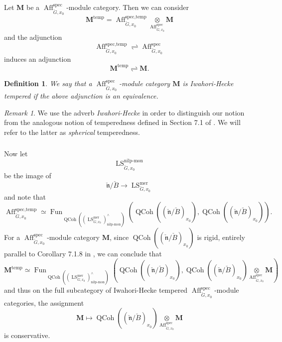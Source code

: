 \documentclass[10pt]{amsart}
\newtheorem{defn}[subsubsection]{Definition}
\theoremstyle{remark}
\newtheorem{rem}[subsubsection]{Remark}
\newcommand{\on}[1]{\operatorname{#1}}
\newcommand{\QCoh}{\on{QCoh}}
\newcommand{\Gcheck}{\check{G}}
\newcommand{\ncheck}{\check{\mathfrak{n}}}
\newcommand{\Bcheck}{\check{B}}
\newcommand{\sssec}[1]{\subsubsection{}}
\begin{document}
\sssec{}
Let $\boldsymbol{M}$ be a $\on{Aff}_{\Gcheck, x_0}^{\on{spec}}$-module category. Then we can consider
$$
\boldsymbol{M}^{\on{temp}} = \on{Aff}_{\Gcheck, x_0}^{\on{spec, temp}} \underset{\on{Aff}_{\Gcheck, x_0}^{\on{spec}}}{\otimes} \boldsymbol{M}
$$
and the adjunction
$$
\on{Aff}_{\Gcheck, x_0}^{\on{spec, temp}} \rightleftharpoons \on{Aff}_{\Gcheck, x_0}^{\on{spec}}
$$
induces an adjunction
$$
\boldsymbol{M}^{\on{temp}} \rightleftharpoons \boldsymbol{M}.
$$

\begin{defn}
    We say that a $\on{Aff}_{\Gcheck, x_0}^{\on{spec}}$-module category $\boldsymbol{M}$ is \emph{Iwahori-Hecke tempered} if the above adjunction is an equivalence.
\end{defn}

\begin{rem}
    We use the adverb \emph{Iwahori-Hecke} in order to distinguish our notion from the analogous notion of temperedness defined in Section 7.1 of \cite{GLC2}. We will refer to the latter as \emph{spherical} temperedness.
\end{rem}

\sssec{}
Now let
$$
\on{LS}_{\Gcheck, x_0}^{\on{nilp-mon}}
$$
be the image of
$$
\ncheck/\Bcheck \to \on{LS}_{\Gcheck, x_0}^{\on{mer}}
$$
and note that
$$
\on{Aff}_{\Gcheck, x_0}^{\on{spec, temp}} \simeq \on{Fun}_{\QCoh((\on{LS}_{\Gcheck, x_0}^{\on{mer}})_{\on{nilp-mon}}^\wedge)}(\QCoh((\ncheck/\Bcheck)_{x_0}), \QCoh((\ncheck/\Bcheck)_{x_0})).
$$
For a $\on{Aff}_{\Gcheck, x_0}^{\on{spec}}$-module category $\boldsymbol{M}$, since $\QCoh((\ncheck/\Bcheck)_{x_0})$ is rigid, entirely parallel to Corollary 7.1.8 in \cite{GLC2}, we can conclude that
$$
\boldsymbol{M}^{\on{temp}} \simeq \on{Fun}_{\QCoh((\on{LS}_{\Gcheck, x_0}^{\on{mer}})_{\on{nilp-mon}}^\wedge)}(\QCoh((\ncheck/\Bcheck)_{x_0}), \QCoh((\ncheck/\Bcheck)_{x_0}) \underset{\on{Aff}_{\Gcheck, x_0}^{\on{spec}}}{\otimes} \boldsymbol{M})
$$
and thus on the full subcategory of Iwahori-Hecke tempered $\on{Aff}_{\Gcheck, x_0}^{\on{spec}}$-module categories, the assignment
$$
\boldsymbol{M} \mapsto \QCoh((\ncheck/\Bcheck)_{x_0}) \underset{\on{Aff}_{\Gcheck, x_0}^{\on{spec}}}{\otimes} \boldsymbol{M}
$$
is conservative.
\end{document}
